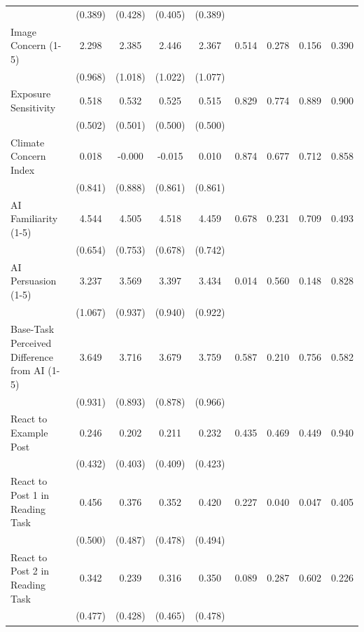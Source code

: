 \begin{tabular}{l*{8}{c}}
                &  (0.389)&  (0.428)&  (0.405)&  (0.389)&         &         &         &         \\
Image Concern (1-5)&    2.298&    2.385&    2.446&    2.367&    0.514&    0.278&    0.156&    0.390\\
                &  (0.968)&  (1.018)&  (1.022)&  (1.077)&         &         &         &         \\
Exposure Sensitivity&    0.518&    0.532&    0.525&    0.515&    0.829&    0.774&    0.889&    0.900\\
                &  (0.502)&  (0.501)&  (0.500)&  (0.500)&         &         &         &         \\
Climate Concern Index&    0.018&   -0.000&   -0.015&    0.010&    0.874&    0.677&    0.712&    0.858\\
                &  (0.841)&  (0.888)&  (0.861)&  (0.861)&         &         &         &         \\
AI Familiarity (1-5)&    4.544&    4.505&    4.518&    4.459&    0.678&    0.231&    0.709&    0.493\\
                &  (0.654)&  (0.753)&  (0.678)&  (0.742)&         &         &         &         \\
AI Persuasion (1-5)&    3.237&    3.569&    3.397&    3.434&    0.014&    0.560&    0.148&    0.828\\
                &  (1.067)&  (0.937)&  (0.940)&  (0.922)&         &         &         &         \\
Base-Task Perceived Difference from AI (1-5)&    3.649&    3.716&    3.679&    3.759&    0.587&    0.210&    0.756&    0.582\\
                &  (0.931)&  (0.893)&  (0.878)&  (0.966)&         &         &         &         \\
React to Example Post&    0.246&    0.202&    0.211&    0.232&    0.435&    0.469&    0.449&    0.940\\
                &  (0.432)&  (0.403)&  (0.409)&  (0.423)&         &         &         &         \\
React to Post 1 in Reading Task&    0.456&    0.376&    0.352&    0.420&    0.227&    0.040&    0.047&    0.405\\
                &  (0.500)&  (0.487)&  (0.478)&  (0.494)&         &         &         &         \\
React to Post 2 in Reading Task&    0.342&    0.239&    0.316&    0.350&    0.089&    0.287&    0.602&    0.226\\
                &  (0.477)&  (0.428)&  (0.465)&  (0.478)&         &         &         &         \\

\end{tabular}
